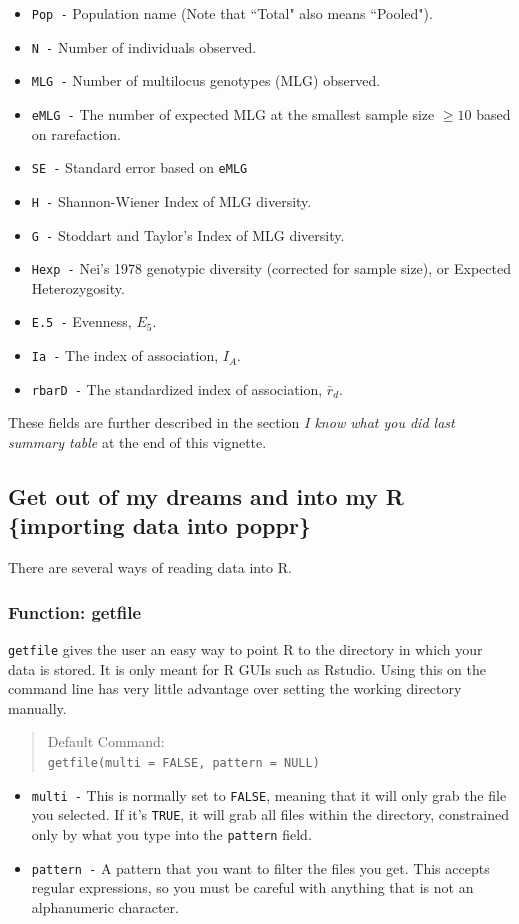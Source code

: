 \documentclass[letterpaper]{article}
\newcommand{\tab}{\hspace*{1em}}
\begin{document}
\begin{itemize}
  \item \texttt{Pop -} Population name (Note that ``Total" also means ``Pooled").
  \item \texttt{N -} Number of individuals observed.
  \item \texttt{MLG -} Number of multilocus genotypes (MLG) observed.
  \item \texttt{eMLG -} The number of expected MLG at the smallest sample size $\geq 10$ based on rarefaction. \cite{Hurlbert:1971}
  \item \texttt{SE -} Standard error based on \texttt{eMLG} \cite{Heck:1975}
  \item \texttt{H -} Shannon-Wiener Index of MLG diversity. \cite{Shannon:1948}
  \item \texttt{G -} Stoddart and Taylor's Index of MLG diversity. \cite{Stoddart:1988}
  \item \texttt{Hexp -} Nei's 1978 genotypic diversity (corrected for sample size), or  Expected Heterozygosity. \cite{Nei:1978}
  \item \texttt{E.5 -} Evenness, $E_5$. \cite{Pielou:1975}\cite{Ludwig:1988}\cite{Grunwald:2003}
  \item \texttt{Ia -} The index of association, $I_A$. \cite{Brown:1980} \cite{Smith:1993} \cite{Agapow:2001}
  \item \texttt{rbarD -} The standardized index of association, $\bar r_d$. \cite{Agapow:2001}
\end{itemize}
These fields are further described in the section \textit{I know what you did last summary table} at the end of this vignette.

\subsection{Get out of my dreams and into my R \{importing data into poppr\}}
There are several ways of reading data into R. 
\subsubsection{Function: getfile}
\tab\tab \texttt{getfile} gives the user an easy way to point R to the directory in which your data is stored. It is only meant for R GUIs such as Rstudio. Using this on the command line has very little advantage over setting the working directory manually. 
\begin{quote}
Default Command:\\
\texttt{getfile(multi = FALSE, pattern = NULL)}
\end{quote}
\begin{itemize}
  \item \texttt{multi -} This is normally set to \texttt{FALSE}, meaning that it will only grab the file you selected. If it's \texttt{TRUE}, it will grab all files within the directory, constrained only by what you type into the \texttt{pattern} field.
  \item \texttt{pattern -} A pattern that you want to filter the files you get. This accepts regular expressions, so you must be careful with anything that is not an alphanumeric character.
\end{itemize}
\end{document}
